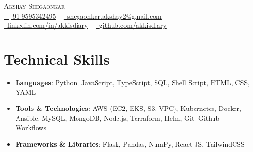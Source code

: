 \documentclass[letterpaper,11pt]{article}
\newcommand{\resumeItem}[1]{
    \item
        \small{#1}
}
\newcommand{\resumeItemListStart}{\begin{itemize}}
\newcommand{\resumeItemListEnd}{\end{itemize}}
\begin{document}
\begin{center}
    {\Huge\scshape Akshay Shegaonkar} \\ \vspace{1pt}
    \href{tel:+919595342495}{\raisebox{-0.2\height}\faPhone\ \underline{+91 9595342495}} ~
    \href{mailto:shegaonkar.akshay2@gmail.com}{\raisebox{-0.2\height}\faEnvelope\  \underline{shegaonkar.akshay2@gmail.com}} ~
    \href{https://www.linkedin.com/in/akkisdiary/}{\raisebox{-0.2\height}\faLinkedin\ \underline{linkedin.com/in/akkisdiary}} ~
    \href{https://github.com/akkisdiary}{\raisebox{-0.2\height}\faGithub\ \underline{github.com/akkisdiary}}
\end{center}

\section{Technical Skills}
\resumeItemListStart
    \resumeItem
    {\textbf{Languages}: Python, JavaScript, TypeScript, SQL, Shell Script, HTML, CSS, YAML}
    \resumeItem
    {\textbf{Tools \& Technologies}: AWS (EC2, EKS, S3, VPC), Kubernetes, Docker, Ansible, MySQL, MongoDB, Node.js, Terraform, Helm, Git, Github Workflows}
    \resumeItem
    {\textbf{Frameworks \& Libraries}: Flask, Pandas, NumPy, React JS, TailwindCSS}
\resumeItemListEnd


\end{document}
